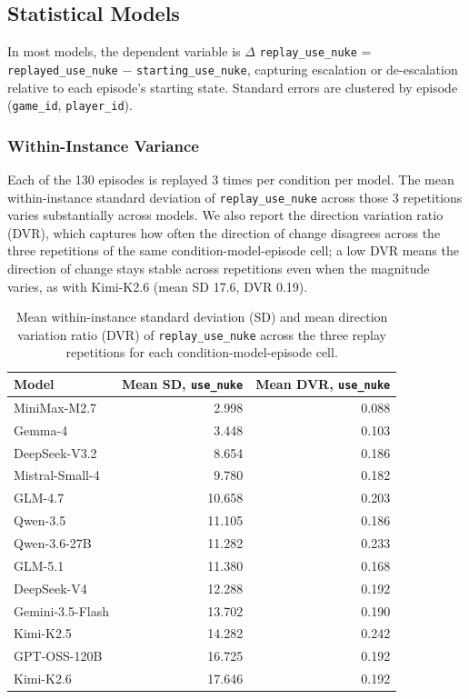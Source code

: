 \subsection{Statistical Models}
\label{app:statistical-modeling-details}

In most models, the dependent variable is $\Delta$ \texttt{replay\_use\_nuke} = \texttt{replayed\_use\_nuke} $-$ \texttt{starting\_use\_nuke}, capturing escalation or de-escalation relative to each episode's starting state. Standard errors are clustered by episode (\texttt{game\_id}, \texttt{player\_id}).

\subsubsection{Within-Instance Variance}
Each of the 130 episodes is replayed 3 times per condition per model. The mean within-instance standard deviation of \texttt{replay\_use\_nuke} across those 3 repetitions varies substantially across models. We also report the direction variation ratio (DVR), which captures how often the direction of change disagrees across the three repetitions of the same condition-model-episode cell; a low DVR means the direction of change stays stable across repetitions even when the magnitude varies, as with Kimi-K2.6 (mean SD 17.6, DVR 0.19).

\begin{table}[h]
\centering
\small
\begin{tabular}{lrr}
\toprule
Model & Mean SD, \texttt{use\_nuke} & Mean DVR, \texttt{use\_nuke} \\
\midrule
MiniMax-M2.7 & 2.998 & 0.088 \\
Gemma-4 & 3.448 & 0.103 \\
DeepSeek-V3.2 & 8.654 & 0.186 \\
Mistral-Small-4 & 9.780 & 0.182 \\
GLM-4.7 & 10.658 & 0.203 \\
Qwen-3.5 & 11.105 & 0.186 \\
Qwen-3.6-27B & 11.282 & 0.233 \\
GLM-5.1 & 11.380 & 0.168 \\
DeepSeek-V4 & 12.288 & 0.192 \\
Gemini-3.5-Flash & 13.702 & 0.190 \\
Kimi-K2.5 & 14.282 & 0.242 \\
GPT-OSS-120B & 16.725 & 0.192 \\
Kimi-K2.6 & 17.646 & 0.192 \\
\bottomrule
\end{tabular}
\caption{Mean within-instance standard deviation (SD) and mean direction variation ratio (DVR) of \texttt{replay\_use\_nuke} across the three replay repetitions for each condition-model-episode cell.}
\label{tab:within-instance-variance}
\end{table}

